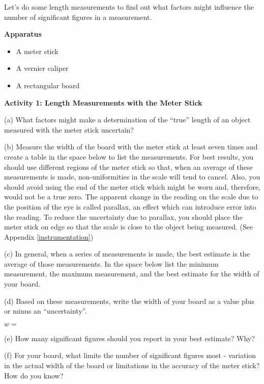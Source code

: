 Let's do some length measurements to find out what factors might influence the
number of significant figures in a measurement. 

\textbf{Apparatus} 

\begin{itemize}
\item A meter stick 
\item A vernier caliper 
\item A rectangular board
\end{itemize}
\textbf{Activity 1: Length Measurements with the Meter Stick }

(a) What factors might make a determination of the ``true''
length of an object measured with the meter stick uncertain? 
\vspace{20mm}

(b) Measure the width of the board with the meter stick at least seven times
and create a table in the space below to list the measurements. For best results,
you should use different regions of the meter stick so that, when an average
of these measurements is made, non-uniformities in the scale will tend to cancel.
Also, you should avoid using the end of the meter stick which might be worn
and, therefore, would not be a true zero. The apparent change in the reading
on the scale due to the position of the eye is called parallax, an effect which
can introduce error into the reading. To reduce the uncertainty due to parallax,
you should place the meter stick on edge so that the scale is close to the object
being measured. (See Appendix \ref{instrumentation}) 
\vspace{35mm}

(c) In general, when a series of measurements is made, the best estimate is
the average of those measurements. In the space below list the minimum measurement,
the maximum measurement, and the best estimate for the width of your board.
\vspace{20mm}

(d) Based on these measurements, write the width of your board as a value plus or minus an ``uncertainty''.

\vspace{4mm}
\hspace {45mm} $w =$
\vspace{3mm}


(e) How many significant figures should you report in your best estimate? Why?
\vspace{20mm}

(f) For your board, what limits the number of significant figures most - variation
in the actual width of the board or limitations in the accuracy of the meter
stick? How do you know?
\vspace{25mm}

